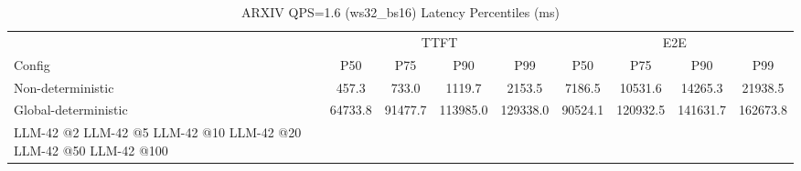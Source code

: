 \begin{table}[htbp]
\centering
\caption{ARXIV QPS=1.6 (ws32_bs16) Latency Percentiles (ms)}
\label{tab:arxiv_qps1.6_ws32_bs16}
\begin{tabular}{l|cccc|cccc}
\toprule
& \multicolumn{4}{c|}{TTFT} & \multicolumn{4}{c}{E2E} \\
Config & P50 & P75 & P90 & P99 & P50 & P75 & P90 & P99 \\
\midrule
Non-deterministic & 457.3 & 733.0 & 1119.7 & 2153.5 & 7186.5 & 10531.6 & 14265.3 & 21938.5 \\
Global-deterministic & 64733.8 & 91477.7 & 113985.0 & 129338.0 & 90524.1 & 120932.5 & 141631.7 & 162673.8 \\
LLM-42 @2%
LLM-42 @5%
LLM-42 @10%
LLM-42 @20%
LLM-42 @50%
LLM-42 @100%
\bottomrule
\end{tabular}
\end{table}
